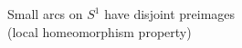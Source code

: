\documentclass[preview]{standalone}
\begin{document}
\begin{center}
Small arcs on $S^1$ have disjoint preimages\\(local homeomorphism property)
\end{center}
\end{document}
